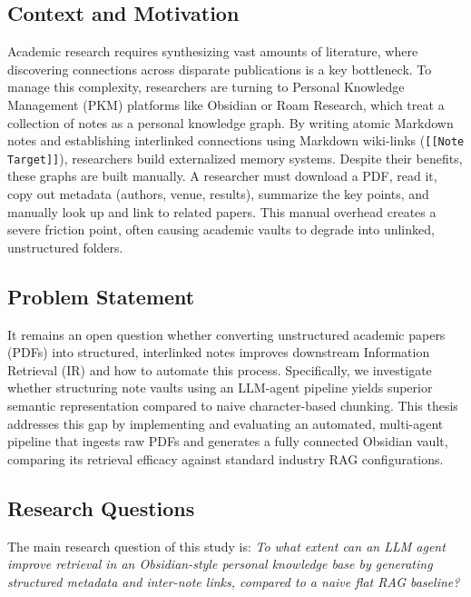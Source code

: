 \documentclass[11pt, a4paper, oneside]{article}
\begin{document}
\subsection{Context and Motivation}
Academic research requires synthesizing vast amounts of literature, where discovering connections across disparate publications is a key bottleneck. To manage this complexity, researchers are turning to Personal Knowledge Management (PKM) platforms like Obsidian or Roam Research, which treat a collection of notes as a personal knowledge graph. By writing atomic Markdown notes and establishing interlinked connections using Markdown wiki-links (\texttt{[[Note Target]]}), researchers build externalized memory systems. Despite their benefits, these graphs are built manually. A researcher must download a PDF, read it, copy out metadata (authors, venue, results), summarize the key points, and manually look up and link to related papers. This manual overhead creates a severe friction point, often causing academic vaults to degrade into unlinked, unstructured folders.

\subsection{Problem Statement}
It remains an open question whether converting unstructured academic papers (PDFs) into structured, interlinked notes improves downstream Information Retrieval (IR) and how to automate this process. Specifically, we investigate whether structuring note vaults using an LLM-agent pipeline yields superior semantic representation compared to naive character-based chunking. This thesis addresses this gap by implementing and evaluating an automated, multi-agent pipeline that ingests raw PDFs and generates a fully connected Obsidian vault, comparing its retrieval efficacy against standard industry RAG configurations.

\subsection{Research Questions}
\label{sec:rqs}
The main research question of this study is:
\textit{To what extent can an LLM agent improve retrieval in an Obsidian-style personal knowledge base by generating structured metadata and inter-note links, compared to a naive flat RAG baseline?}
\end{document}
